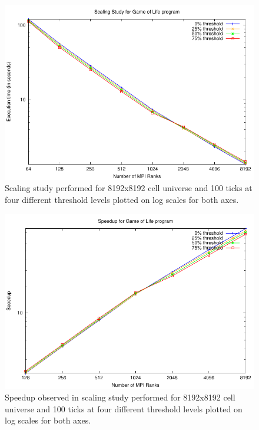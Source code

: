 \documentclass[11pt]{article}
\numberwithin{figure}{section}
\begin{document}
\begin{figure}[t]
\centering
   \includegraphics{data/scaling-64.pdf}
\caption{Scaling study performed for 8192x8192 cell universe and 100 ticks at four different threshold levels plotted on log scales for both axes.}
\label{fig:scaling}
\end{figure}
\begin{figure}[t]
\centering
   \includegraphics{data/speedup.pdf}
\caption{Speedup observed in scaling study performed for 8192x8192 cell universe and 100 ticks at four different threshold levels plotted on log scales for both axes.}
\label{fig:speedup}
\end{figure}
\end{document}
